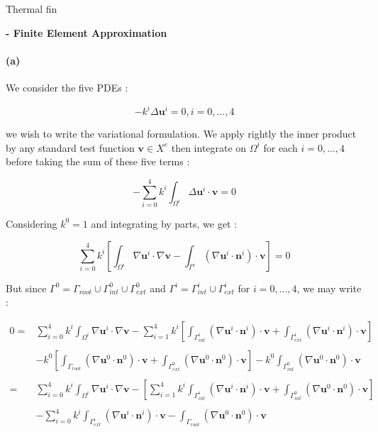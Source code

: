 \documentclass[a4paper]{article}
\date{}
\author{Philippe Ricka}
\title{}
\newcounter{c}
\newcounter{d}
\newcounter{r}
\newcounter{e}
\newcommand{\chapitre}[1]{\stepcounter{c}\setcounter{e}{0}\setcounter{d}{0}\setcounter{r}{0}\bigskip\noindent\textbf{\Large\Roman{c} - #1}\\}
\newcommand{\bu}{\mathbf u}
\newcommand{\bv}{\mathbf v}
\begin{document}

\begin{center}\huge Thermal fin\end{center}

\bigskip

\chapitre{Finite Element Approximation}


\paragraph{(a)}We consider the five PDEs :

$$-k^i\Delta\bu^i=0,i=0,...,4$$


\noindent we wish to write the variational formulation. We apply rightly the inner product by any standard test function $\bv\in X^e$ then integrate on $\Omega^i$ for each $i=0,...,4$ before taking the sum of these five terms :

$$-\sum_{i=0}^4k^i\int_{\Omega^i}\Delta\bu^i\cdot\bv=0$$


Considering $k^0=1$ and integrating by parts, we get :

$$\sum_{i=0}^4k^i\left[\int_{\Omega^i}\nabla\bu^i\cdot\nabla\bv-\int_{\Gamma^i}(\nabla\bu^i\cdot\mathbf n^i)\cdot\bv\right]=0$$


But since $\Gamma^0=\Gamma_{root}\cup\Gamma^0_{int}\cup\Gamma^0_{ext}$ and $\Gamma^i=\Gamma^i_{int}\cup\Gamma^i_{ext}$ for $i=0,...,4$, we may write :

$$\begin{array}{rl}0=&\displaystyle\sum_{i=0}^4k^i\int_{\Omega^i}\nabla\bu^i\cdot\nabla\bv-\sum_{i=1}^4k^i\left[\int_{\Gamma^i_{int}}(\nabla\bu^i\cdot\mathbf n^i)\cdot\bv+\int_{\Gamma_{ext}^i}(\nabla\bu^i\cdot\mathbf n^i)\cdot\bv\right]\\
&\\
&\displaystyle-k^0\left[\int_{\Gamma_{root}}(\nabla\bu^0\cdot\mathbf n^0)\cdot\bv+\int_{\Gamma^0_{ext}}(\nabla\bu^0\cdot\mathbf n^0)\cdot\bv\right]-k^0\int_{\Gamma^0_{int}}(\nabla\bu^0\cdot\mathbf n^0)\cdot\bv\\
&\\
=&\displaystyle\sum_{i=0}^4k^i\int_{\Omega^i}\nabla\bu^i\cdot\nabla\bv-\left[\sum_{i=1}^4k^i\int_{\Gamma^i_{int}}(\nabla\bu^i\cdot\mathbf n^i)\cdot\bv+\int_{\Gamma^0_{int}}(\nabla\bu^0\cdot\mathbf n^0)\cdot\bv\right]\\
&\\
&\displaystyle-\sum_{i=0}^4k^i\int_{\Gamma^i_{ext}}(\nabla\bu^i\cdot\mathbf n^i)\cdot\bv-\int_{\Gamma_{root}}(\nabla\bu^0\cdot\mathbf n^0)\cdot\bv
\end{array}$$
\end{document}
